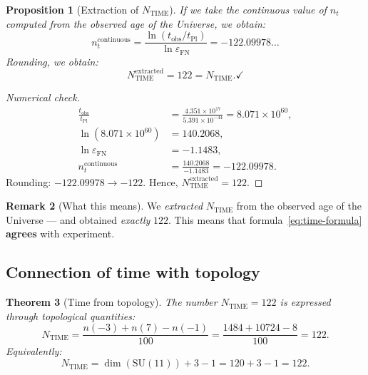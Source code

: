 \documentclass[11pt,a4paper]{article}
\newcommand{\SU}{\mathrm{SU}}
\newcommand{\epsFN}{\varepsilon_{\text{FN}}}
\newtheorem{theorem}{Theorem}[section]
\newtheorem{proposition}[theorem]{Proposition}
\theoremstyle{definition}
\newtheorem{remark}[theorem]{Remark}
\begin{document}
\begin{proposition}[Extraction of $N_{\text{TIME}}$]
\label{prop:ntime-extraction}
If we take the \emph{continuous} value of $n_t$ computed 
from the observed age of the Universe, we obtain:
\begin{equation}
    n_t^{\text{continuous}} 
    = \frac{\ln(t_{\text{obs}}/t_{\text{Pl}})}{\ln \epsFN}
    = -122.09978\ldots
\end{equation}
Rounding, we obtain:
\begin{equation}
    N_{\text{TIME}}^{\text{extracted}} = 122 = N_{\text{TIME}}. \checkmark
\end{equation}
\end{proposition}

\begin{proof}[Numerical check]
\begin{align}
    \frac{t_{\text{obs}}}{t_{\text{Pl}}} 
    &= \frac{4.351 \times 10^{17}}{5.391 \times 10^{-44}} 
    = 8.071 \times 10^{60}, \\
    \ln(8.071 \times 10^{60}) &= 140.2068, \\
    \ln \epsFN &= -1.1483, \\
    n_t^{\text{continuous}} &= \frac{140.2068}{-1.1483} 
    = -122.09978.
\end{align}
Rounding: $-122.09978 \to -122$. Hence, 
$N_{\text{TIME}}^{\text{extracted}} = 122$. \checkmark
\end{proof}

\begin{remark}[What this means]
\label{rem:extraction-meaning}
We \emph{extracted} $N_{\text{TIME}}$ from the observed age 
of the Universe — and obtained \emph{exactly} $122$. This means that 
formula~\eqref{eq:time-formula} \textbf{agrees} with 
experiment.
\end{remark}

\subsection{Connection of time with topology}
\label{subsec:time-topology}

\begin{theorem}[Time from topology]
\label{thm:time-from-topology}
The number $N_{\text{TIME}} = 122$ is expressed through topological 
quantities:
\begin{equation}
    \boxed{
    N_{\text{TIME}} = \frac{n(-3) + n(7) - n(-1)}{100}
    = \frac{1484 + 10724 - 8}{100} = 122.
    }
    \label{eq:ntime-topology-1}
\end{equation}
Equivalently:
\begin{equation}
    N_{\text{TIME}} = \dim(\SU(11)) + 3 - 1 = 120 + 3 - 1 = 122.
\end{equation}
\end{theorem}
\end{document}
